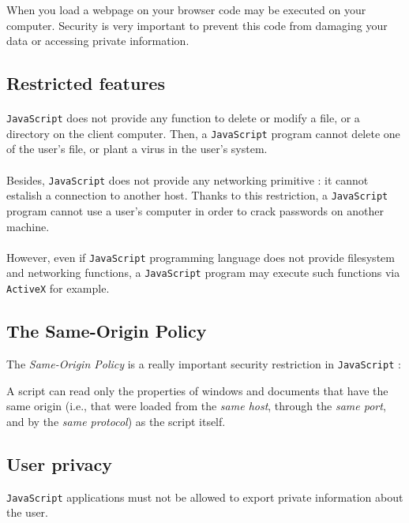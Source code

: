 When you load a webpage on your browser code may be executed on your computer. Security is very important to prevent this code from damaging your data or accessing private information.

\subsection{Restricted features}

\paragraph{}
\texttt{JavaScript} does not provide any function to delete or modify a file, or a directory on the client computer. Then, a \texttt{JavaScript} program cannot delete one of the user's file, or plant a virus in the user's system.

\paragraph{}
Besides, \texttt{JavaScript} does not provide any networking primitive : it cannot estalish a connection to another host. Thanks to this restriction, a \texttt{JavaScript} program cannot use a user's computer in order to crack passwords on another machine.

\paragraph{}
However, even if \texttt{JavaScript} programming language does not provide filesystem and networking functions, a \texttt{JavaScript} program may execute such functions via \texttt{ActiveX} for example.

\subsection{The Same-Origin Policy}
The \emph{Same-Origin Policy} is a really important security restriction in \texttt{JavaScript} :
\begin{center} 
A script can read only the properties of windows and documents that have the same origin (i.e., that were loaded from the \emph{same host}, through the \emph{same port}, and by the \emph{same protocol}) as the script itself. 
\end{center} 


\subsection{User privacy}
\texttt{JavaScript} applications must not be allowed to export private information about the user. 
